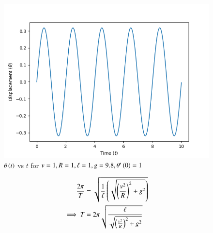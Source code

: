 \documentclass[journal,12pt,twocolumn]{IEEEtran}
\theoremstyle{remark}
\begin{document}
\begin{figure}[h!]
\centering
\includegraphics[width=\columnwidth]{figs/plot.png}
\caption{$\theta\left(t\right)$ vs $t$ for $v = 1, R = 1, \ell = 1, g = 9.8, \theta'\left(0\right) = 1$}
\label{fig:analog_11_14_17_2}
\end{figure}
\begin{align}
\frac{2\pi}{T} &= \sqrt{\frac{1}{\ell}\left(\sqrt{\left(\frac{v^2}{R}\right)^2+g^2}\right)} \\
\implies T &= 2\pi\sqrt{\frac{\ell}{\sqrt{\left(\frac{v^2}{R}\right)^2+g^2}}}
\end{align}
\end{document}
